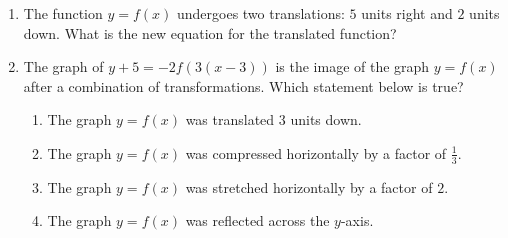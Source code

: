 \documentclass{article}
\begin{document}
\begin{enumerate}
\begin{enumerate}
  
  \end{enumerate}

\item The function $y=f(x)$ undergoes two translations: $5$ units right and $2$ units down. What is the new equation for the translated function?

 \begin{enumerate}
        \end{enumerate}
        
\item The graph of $y+5=-2f(3(x-3))$ is the image of the graph $y=f(x)$ after a combination of transformations. Which statement below is true?

 \begin{enumerate}
          \item The graph $y=f(x)$ was translated $3$ units down.
          \item The graph $y=f(x)$ was compressed horizontally by a factor of $\frac{1}{3}$. %
          \item The graph $y=f(x)$ was stretched horizontally by a factor of $2$.
          \item The graph $y=f(x)$ was reflected across the $y$-axis. 
        \end{enumerate}
        
\end{enumerate}
\end{document}
